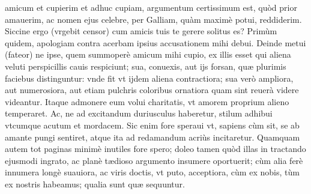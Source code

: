 \documentclass[11pt,a4paper]{article}
\begin{document}

amicum et cupierim et adhuc cupiam, argumentum certissimum est, quòd prior amauerim, ac nomen ejus celebre, per Galliam, quàm maximè potui, reddiderim. Siccine ergo (vrgebit censor) cum amicis tuis te gerere solitus es? Primùm quidem, apologiam contra acerbam ipsius accusationem mihi debui. Deinde metui (fateor) ne ipse, quem summoperè amicum mihi cupio, ex illis esset qui aliena veluti perspicillis cauis respiciunt; sua, conuexis, aut ijs forsan, quæ plurimis faciebus distinguntur: vnde fit vt ijdem aliena contractiora; sua verò ampliora, aut numerosiora, aut etiam pulchris coloribus ornatiora quam sint reuerà videre videantur. Itaque admonere eum volui charitatis, vt amorem proprium alieno temperaret. Ac, ne ad excitandum duriusculus haberetur, stilum adhibui vtcumque acutum et mordacem. Sic enim fore speraui vt, sapiens cùm sit, se ab amante pungi sentiret, atque ita ad redamandum acriùs incitaretur. Quamquam autem tot paginas minimè inutiles fore spero; doleo tamen quòd illas in tractando ejusmodi ingrato, ac planè tædioso argumento insumere oportuerit; cùm alia ferè innumera longè suauiora, ac viris doctis, vt puto, acceptiora, cùm ex nobis, tùm ex nostris habeamus; qualia sunt quæ sequuntur.
\end{document}
